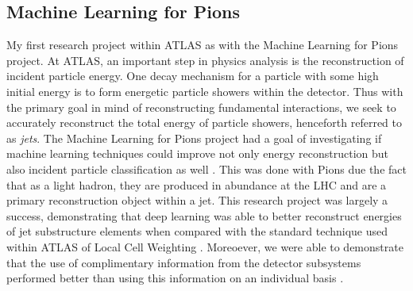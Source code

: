 \documentclass[12pt]{article}
\begin{document}


\subsection{Machine Learning for Pions}
My first research project within ATLAS as with the Machine Learning for Pions
project. At ATLAS, an important step in physics analysis is the reconstruction
of incident particle energy. One decay mechanism for a particle with some high
initial energy is to form energetic particle showers within the detector. Thus
with the primary goal in mind of reconstructing fundamental interactions, we
seek to accurately reconstruct the total energy of particle showers, henceforth
referred to as \textit{jets}. The Machine Learning for Pions project had a goal
of investigating if machine learning techniques could improve not only energy
reconstruction but also incident particle classification as well
\cite{ml4p_prelim}. This was done with Pions due the fact that as a light
hadron, they are produced in abundance at the LHC and are a primary
reconstruction object within a jet. This research project was largely a success,
demonstrating that deep learning was able to better reconstruct energies of jet
substructure elements when compared with the standard technique used within
ATLAS of Local Cell Weighting \cite{ml4p}. Moreoever, we were able to
demonstrate that the use of complimentary information from the detector
subsystems performed better than using this information on an individual basis
\cite{ml4p}.
\end{document}
